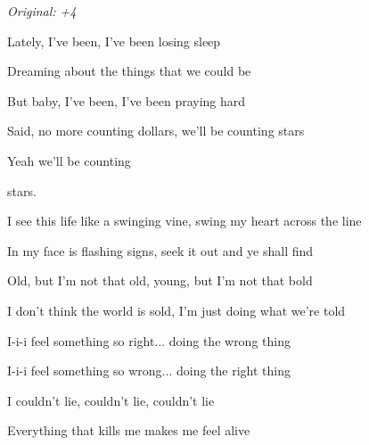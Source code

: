 \begin{song}


\begin{strumbox}
\textit{Original: +4}
\end{strumbox}

\begin{vchordbox}
\vspace{2em}
\end{vchordbox}

\large

\bigskip

Lately, I've been, I've been losing sleep \par
{} Dreaming about the things that we could be \par
But baby, I've been, I've been praying hard \par
{} Said, no more counting dollars, we'll be counting stars \par
{} Yeah we'll be counting  \par

\bigskip

stars.    \par

\bigskip

I see this life like a swinging vine, swing my heart across the line \par
{}In my face is flashing signs,  seek it out and ye shall find \par
{}Old, but I'm not that old, young, but I'm not that bold \par
{}I don't think the world is sold,  I'm just doing what we're told \par

\bigskip

 I-i-i feel something so right... doing the wrong thing \par
{} I-i-i feel something so wrong... doing the right thing \par
{} I couldn't lie, couldn't lie, couldn't lie \par
{}Everything that kills me makes me feel alive \par

\bigskip


\end{song}
